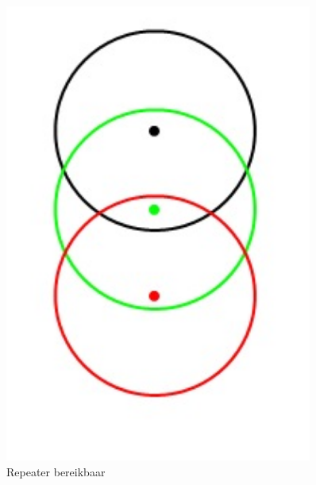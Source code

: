 \documentclass[a4paper,10pt]{article}
\begin{document}
\begin{figure}[ht!]
\begin{minipage}{\textwidth}
\begin{minipage}{0.3\textwidth}
            \includegraphics[width=0.9\textwidth]{twee.jpg}
            \caption*{Repeater bereikbaar}
        \end{minipage}
        \hfill
        \begin{minipage}{0.3\textwidth}
            \centering

\end{minipage}
\end{minipage}
\end{figure}
\end{document}
